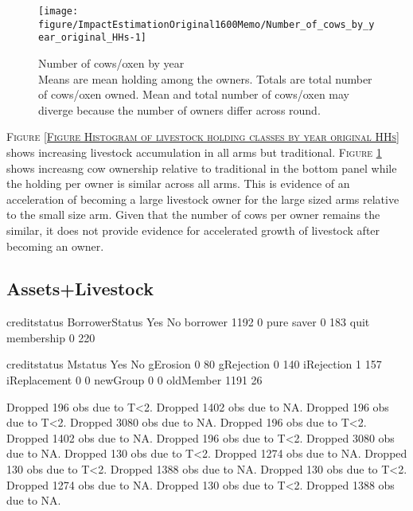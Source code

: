 \begin{Schunk}
\begin{figure}

{\centering \texttt{[image: figure/ImpactEstimationOriginal1600Memo/Number\_of\_cows\_by\_year\_original\_HHs-1]} 

}

\caption{Number of cows/oxen by year\\ {\footnotesize Means are mean holding among the owners. Totals are total number of cows/oxen owned. Mean and total number of cows/oxen may diverge because the number of owners differ across round.\setlength{\baselineskip}{8pt}}}\label{Figure Number of cows by year original HHs}
\end{figure}
\end{Schunk}


\begin{palepinkleftbar}
\begin{finding}
\textsc{Figure \ref{Figure Histogram of livestock holding classes by year original HHs}} shows increasing livestock accumulation in all arms but \textsf{traditional}. 
\textsc{Figure \ref{Figure Number of cows by year original HHs}} shows increasng cow ownership relative to \textsf{traditional} in the bottom panel while the holding per owner is similar across all arms. This is evidence of an acceleration of becoming a large livestock owner for the large sized arms relative to the small size arm. Given that the number of cows per owner remains the similar, it does not provide evidence for accelerated growth of livestock after becoming an owner.
\end{finding}
\end{palepinkleftbar}


\subsection{Assets+Livestock}




\begin{Schunk}
\begin{Soutput}
                 creditstatus
BorrowerStatus     Yes   No
  borrower        1192    0
  pure saver         0  183
  quit membership    0  220
\end{Soutput}
\begin{Soutput}
              creditstatus
Mstatus         Yes   No
  gErosion        0   80
  gRejection      0  140
  iRejection      1  157
  iReplacement    0    0
  newGroup        0    0
  oldMember    1191   26
\end{Soutput}
\begin{Soutput}
Dropped 196 obs due to T<2.
Dropped 1402 obs due to NA.
Dropped 196 obs due to T<2.
Dropped 3080 obs due to NA.
Dropped 196 obs due to T<2.
Dropped 1402 obs due to NA.
Dropped 196 obs due to T<2.
Dropped 3080 obs due to NA.
Dropped 130 obs due to T<2.
Dropped 1274 obs due to NA.
Dropped 130 obs due to T<2.
Dropped 1388 obs due to NA.
Dropped 130 obs due to T<2.
Dropped 1274 obs due to NA.
Dropped 130 obs due to T<2.
Dropped 1388 obs due to NA.
\end{Soutput}
\end{Schunk}

